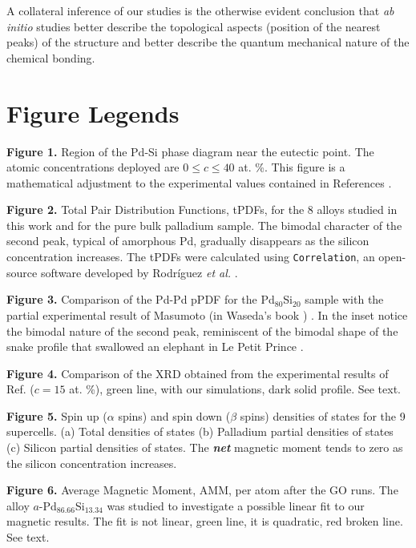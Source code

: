 \documentclass[fleqn,12pt]{wlscirep}
\begin{document}
A collateral inference of our studies is the otherwise evident conclusion that \textit{ab initio} studies better describe the topological aspects (position of the nearest peaks) of the structure and better describe the quantum mechanical nature of the chemical bonding.



\section*{Figure Legends}

\noindent \textbf{Figure 1.} Region of the Pd-Si phase diagram near the eutectic point. The atomic concentrations deployed are $0 \leq c \leq 40$ at. \%. This figure is a mathematical adjustment to the experimental values contained in References \cite{Okamoto_1993, Baxi_1991, Massara_1993}.

\noindent \textbf{Figure 2.} Total Pair Distribution Functions, tPDFs, for the 8 alloys studied in this work and for the pure bulk palladium sample. The bimodal character of the second peak, typical of amorphous Pd, gradually disappears as the silicon concentration increases. The tPDFs were calculated using \texttt{Correlation}, an open-source software developed by Rodr\'{i}guez \textit{et al.} \cite{Correlation_2021}.

\noindent \textbf{Figure 3.} Comparison of the Pd-Pd pPDF for the Pd$_{80}$Si$_{20}$ sample with the partial experimental result of Masumoto (in Waseda's book \cite{Waseda_1980}) \cite{Waseda_1975}. In the inset notice the bimodal nature of the second peak, reminiscent of the bimodal shape of the snake profile that swallowed an elephant in Le Petit Prince \cite{The_Little_Prince}.

\noindent \textbf{Figure 4.} Comparison of the XRD obtained from the experimental results of Ref. \cite{Duwez_1965} ($c = 15$ at. \%), green line, with our simulations, dark solid profile. See text.

\noindent \textbf{Figure 5.} Spin up ($\alpha$ spins) and spin down ($\beta$ spins) densities of states for the 9 supercells. (a) Total densities of states (b) Palladium partial densities of states (c) Silicon partial densities of states. The \textbf{\textit{net}} magnetic moment tends to zero as the silicon concentration increases.

\noindent \textbf{Figure 6.} Average Magnetic Moment, AMM, per atom after the GO runs. The alloy $a$-Pd$_{86.66}$Si$_{13.34}$ was studied to investigate a possible linear fit to our magnetic results. The fit is not linear, green line, it is quadratic, red broken line. See text.
\end{document}
